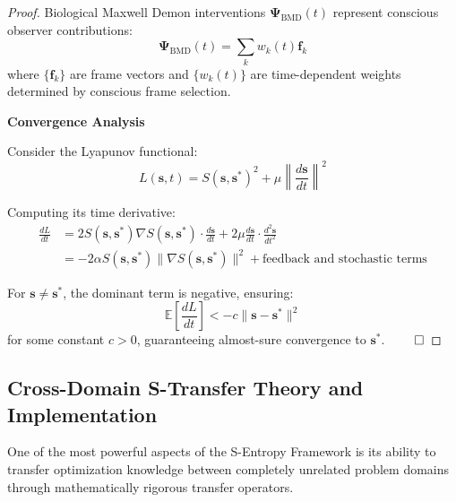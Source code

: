 \documentclass[11pt]{article}
\theoremstyle{definition}
\theoremstyle{remark}
\newcommand{\Expectation}{\mathbb{E}}
\begin{document}
\begin{proof}
Biological Maxwell Demon interventions $\mathbf{\Psi}_{\text{BMD}}(t)$ represent conscious observer contributions:
\begin{equation}
\mathbf{\Psi}_{\text{BMD}}(t) = \sum_{k} w_k(t) \mathbf{f}_k
\end{equation}
where $\{\mathbf{f}_k\}$ are frame vectors and $\{w_k(t)\}$ are time-dependent weights determined by conscious frame selection.

\textbf{Convergence Analysis}

Consider the Lyapunov functional:
\begin{equation}
L(\mathbf{s}, t) = S(\mathbf{s}, \mathbf{s}^*)^2 + \mu \left\|\frac{d\mathbf{s}}{dt}\right\|^2
\end{equation}

Computing its time derivative:
\begin{align}
\frac{dL}{dt} &= 2 S(\mathbf{s}, \mathbf{s}^*) \nabla S(\mathbf{s}, \mathbf{s}^*) \cdot \frac{d\mathbf{s}}{dt} + 2\mu \frac{d\mathbf{s}}{dt} \cdot \frac{d^2\mathbf{s}}{dt^2} \\
&= -2\alpha S(\mathbf{s}, \mathbf{s}^*) \|\nabla S(\mathbf{s}, \mathbf{s}^*)\|^2 + \text{feedback and stochastic terms}
\end{align}

For $\mathbf{s} \neq \mathbf{s}^*$, the dominant term is negative, ensuring:
\begin{equation}
\Expectation\left[\frac{dL}{dt}\right] < -c \|\mathbf{s} - \mathbf{s}^*\|^2
\end{equation}
for some constant $c > 0$, guaranteeing almost-sure convergence to $\mathbf{s}^*$. $\qed$
\end{proof}

\subsection{Cross-Domain S-Transfer Theory and Implementation}

One of the most powerful aspects of the S-Entropy Framework is its ability to transfer optimization knowledge between completely unrelated problem domains through mathematically rigorous transfer operators.
\end{document}
